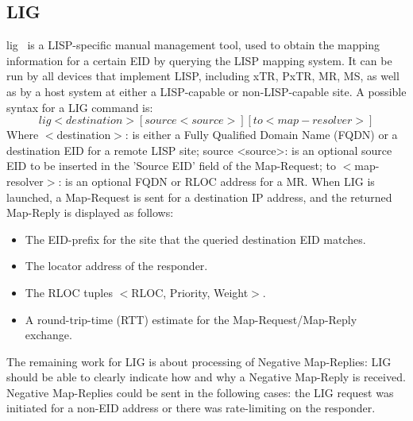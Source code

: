 \subsection{LIG}
\label{subsec:implementation_lig}
\acrfull{lig}~\cite{rfc6835} is a LISP-specific manual management tool, used to obtain the mapping information for a certain EID by querying the LISP mapping system. It can be run by all devices that implement LISP, including xTR, PxTR, MR, MS, as well as by a host system at either a LISP-capable or non-LISP-capable site. A possible syntax for a LIG command is:
\begin{equation}
lig <destination> [source <source>] [to <map-resolver>] \nonumber
\end{equation}
Where $<$destination$>$: is either a Fully Qualified Domain Name (FQDN) or a destination EID for a remote LISP site; source <source>: is an optional source EID to be inserted in the 'Source EID' field of the Map-Request; to $<$map-resolver$>$: is an optional FQDN or RLOC address for a MR. When LIG is launched, a Map-Request is sent for a destination IP address, and the returned Map-Reply is displayed as follows:
\begin{itemize}[noitemsep,topsep=0pt]
    \item The EID-prefix for the site that the queried destination EID matches.
    \item The locator address of the responder.
    \item The RLOC tuples $<$RLOC, Priority, Weight$>$.
    \item A round-trip-time (RTT) estimate for the Map-Request/Map-Reply exchange.
\end{itemize}

The remaining work for LIG is about processing of Negative Map-Replies: LIG should be able to clearly indicate how and why a Negative Map-Reply is received. Negative Map-Replies could be sent in the following cases: the LIG request was initiated for a non-EID address or there was rate-limiting on the responder.

